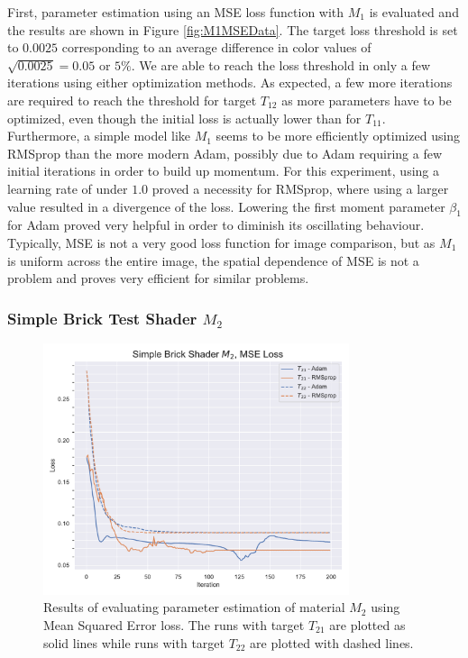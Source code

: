 First, parameter estimation using an MSE loss function with $M_1$ is evaluated and the results are shown in Figure \ref{fig:M1MSEData}. The target loss threshold is set to $0.0025$ corresponding to an average difference in color values of $\sqrt{0.0025}=0.05$ or $5\%$. We are able to reach the loss threshold in only a few iterations using either optimization methods. As expected, a few more iterations are required to reach the threshold for target $T_{12}$ as more parameters have to be optimized, even though the initial loss is actually lower than for $T_{11}$. Furthermore, a simple model like $M_1$ seems to be more efficiently optimized using RMSprop than the more modern Adam, possibly due to Adam requiring a few initial iterations in order to build up momentum. For this experiment, using a learning rate of under $1.0$ proved a necessity for RMSprop, where using a larger value resulted in a divergence of the loss. Lowering the first moment parameter $\beta_1$ for Adam proved very helpful in order to diminish its oscillating behaviour. Typically, MSE is not a very good loss function for image comparison, but as $M_1$ is uniform across the entire image, the spatial dependence of MSE is not a problem and proves very efficient for similar problems.

\subsubsection{Simple Brick Test Shader $M_2$}
\begin{figure}
    \centering
    \includegraphics[width=0.8\textwidth]{img/evaluation/M2/SBS_MSE.pdf}
    \caption{Results of evaluating parameter estimation of material $M_2$ using Mean Squared Error loss. The runs with target $T_{21}$ are plotted as solid lines while runs with target $T_{22}$ are plotted with dashed lines.}
    \label{fig:M2MSEData}
\end{figure}

